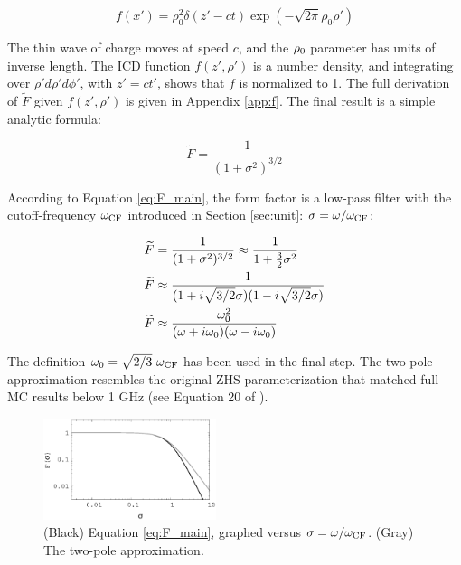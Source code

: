 \documentclass[amsmath,amssymb,aps,prd,10pt,twocolumn]{revtex4}
\begin{document}
\begin{equation}
f(x') = \rho_0^2 \delta(z' - ct) \exp(-\sqrt{2\pi}\rho_0 \rho') \label{eq:f}
\end{equation}

The thin wave of charge moves at speed $c$, and the $\rho_{\rm 0}$ parameter has units of inverse length.  The ICD function $f(z',\rho')$ is a number density, and integrating over $\rho'd\rho'd\phi'$, with $z' = ct'$, shows that $f$ is normalized to 1.  The full derivation of $\widetilde{F}$ given $f(z',\rho')$ is given in Appendix \ref{app:f}.  The final result is a simple analytic formula:

\begin{equation}
\boxed{
\widetilde{F} = \frac{1}{(1+\sigma^2)^{3/2}}
} \label{eq:F_main}
\end{equation}

According to Equation \ref{eq:F_main}, the form factor is a low-pass filter with the cutoff-frequency $\omega_{\rm CF}$ introduced in Section \ref{sec:unit}: $\sigma = \omega/\omega_{\rm CF}$:

\begin{align}
\widetilde{F} &= \frac{1}{(1+\sigma^2)^{3/2}} \approx \frac{1}{1+\frac{3}{2} \sigma^2} \\
\widetilde{F} &\approx \frac{1}{(1+i \sqrt{3/2}\sigma)(1-i \sqrt{3/2} \sigma)} \\
\widetilde{F} &\approx \frac{\omega_{\rm 0}^2}{(\omega+i\omega_{\rm 0})(\omega-i\omega_{\rm 0})}
\end{align}

The definition $\omega_{\rm 0} = \sqrt{2/3} ~ \omega_{\rm CF}$ has been used in the final step.  The two-pole approximation resembles the original ZHS parameterization that matched full MC results below 1 GHz (see Equation 20 of \cite{zhs}).

\begin{figure}
\centering
\includegraphics[width=0.45\textwidth]{April23_plot1.eps}
\caption{\label{fig:F}  (Black) Equation \ref{eq:F_main}, graphed versus $\sigma = \omega/\omega_{\rm CF}$. (Gray) The two-pole approximation.}
\end{figure}
\end{document}
